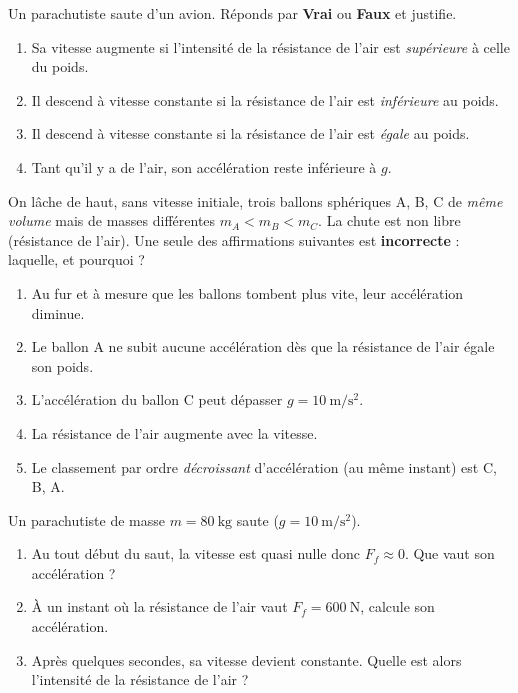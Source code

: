 \documentclass[11pt,a4paper]{article}
\begin{document}

\begin{exo}
Un parachutiste saute d'un avion. Réponds par \textbf{Vrai} ou \textbf{Faux} et justifie.
\begin{enumerate}[label=\Alph*.]
  \item Sa vitesse augmente si l'intensité de la résistance de l'air est \emph{supérieure} à celle du poids.
  \item Il descend à vitesse constante si la résistance de l'air est \emph{inférieure} au poids.
  \item Il descend à vitesse constante si la résistance de l'air est \emph{égale} au poids.
  \item Tant qu'il y a de l'air, son accélération reste inférieure à $g$.
\end{enumerate}
\end{exo}

\begin{exo}
On lâche de haut, sans vitesse initiale, trois ballons sphériques A, B, C de \emph{même volume} mais de
masses différentes $m_A<m_B<m_C$. La chute est non libre (résistance de l'air). Une seule des
affirmations suivantes est \textbf{incorrecte} : laquelle, et pourquoi ?
\begin{enumerate}[label=\Alph*.]
  \item Au fur et à mesure que les ballons tombent plus vite, leur accélération diminue.
  \item Le ballon A ne subit aucune accélération dès que la résistance de l'air égale son poids.
  \item L'accélération du ballon C peut dépasser $g=\qty{10}{\metre\per\second\squared}$.
  \item La résistance de l'air augmente avec la vitesse.
  \item Le classement par ordre \emph{décroissant} d'accélération (au même instant) est C, B, A.
\end{enumerate}
\end{exo}

\begin{exo}
Un parachutiste de masse $m=\qty{80}{\kilogram}$ saute ($g=\qty{10}{\metre\per\second\squared}$).
\begin{enumerate}[label=\alph*)]
  \item Au tout début du saut, la vitesse est quasi nulle donc $F_f\approx 0$. Que vaut son accélération ?
  \item À un instant où la résistance de l'air vaut $F_f=\qty{600}{\newton}$, calcule son accélération.
  \item Après quelques secondes, sa vitesse devient constante. Quelle est alors l'intensité de la résistance de l'air ?
\end{enumerate}
\end{exo}
\end{document}
